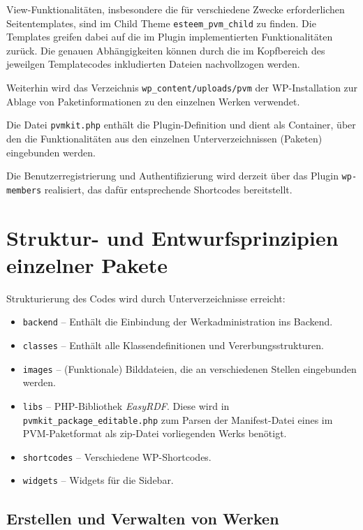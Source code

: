 \documentclass[a4paper,11pt]{article}
\begin{document}
View-Funktionalitäten, insbesondere die für verschiedene Zwecke erforderlichen
Seitentemplates, sind im Child Theme \texttt{esteem\_pvm\_child} zu finden. Die
Templates greifen dabei auf die im Plugin implementierten Funktionalitäten
zurück.  Die genauen Abhängigkeiten können durch die im Kopfbereich des
jeweilgen Templatecodes inkludierten Dateien nachvollzogen werden.

Weiterhin wird das Verzeichnis \texttt{wp\_content/uploads/pvm} der
WP-Installation zur Ablage von Paketinformationen zu den einzelnen Werken
verwendet.

Die Datei \texttt{pvmkit.php} enthält die Plugin-Definition und dient als
Container, über den die Funktionalitäten aus den einzelnen Unterverzeichnissen
(Paketen) eingebunden werden. 

Die Benutzerregistrierung und Authentifizierung wird derzeit über das Plugin
\texttt{wp-members} realisiert, das dafür entsprechende Shortcodes
bereitstellt. 
 
\section{Struktur- und Entwurfsprinzipien einzelner Pakete}
 
Strukturierung des Codes wird durch Unterverzeichnisse erreicht: 
\begin{itemize}\itemsep0pt
\item \texttt{backend} -- Enthält die Einbindung der Werkadministration ins
  Backend. 
\item \texttt{classes} -- Enthält alle Klassendefinitionen und
  Vererbungsstrukturen. 
\item \texttt{images} -- (Funktionale) Bilddateien, die an verschiedenen
  Stellen eingebunden werden.
\item \texttt{libs} -- PHP-Bibliothek \emph{EasyRDF}.  Diese wird in
  \texttt{pvmkit\_package\_editable.php} zum Parsen der Manifest-Datei eines im
  PVM-Paketformat als zip-Datei vorliegenden Werks benötigt.  
\item \texttt{shortcodes} -- Verschiedene WP-Shortcodes. 
\item \texttt{widgets} -- Widgets für die Sidebar.
\end{itemize}

\subsection{Erstellen und Verwalten von Werken}
\end{document}
